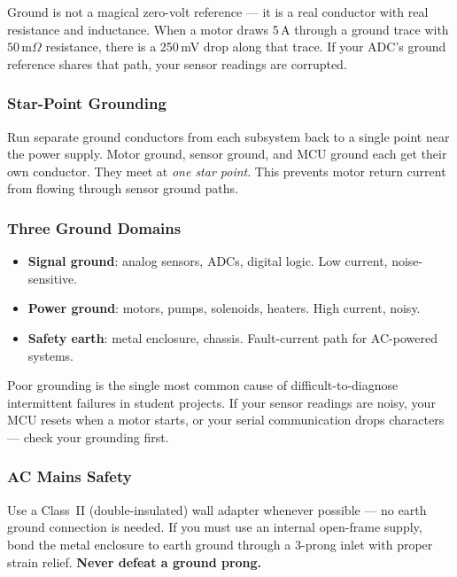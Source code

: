 \documentclass[11pt,letterpaper,twoside,openany]{book}
\newcommand{\mohm}{\,\text{m}\Omega}
\begin{document}
Ground is not a magical zero-volt reference --- it is a real conductor with real resistance and inductance. When a motor draws 5\,A through a ground trace with $50\mohm$ resistance, there is a 250\,mV drop along that trace. If your ADC's ground reference shares that path, your sensor readings are corrupted.

\subsubsection{Star-Point Grounding}
Run separate ground conductors from each subsystem back to a single point near the power supply. Motor ground, sensor ground, and MCU ground each get their own conductor. They meet at \emph{one star point}. This prevents motor return current from flowing through sensor ground paths.

\subsubsection{Three Ground Domains}
\begin{itemize}[nosep,leftmargin=1.5em]
  \item \textbf{Signal ground}: analog sensors, ADCs, digital logic. Low current, noise-sensitive.
  \item \textbf{Power ground}: motors, pumps, solenoids, heaters. High current, noisy.
  \item \textbf{Safety earth}: metal enclosure, chassis. Fault-current path for AC-powered systems.
\end{itemize}

\begin{warningbox}
Poor grounding is the single most common cause of difficult-to-diagnose intermittent failures in student projects. If your sensor readings are noisy, your MCU resets when a motor starts, or your serial communication drops characters --- check your grounding first.
\end{warningbox}

\subsubsection{AC Mains Safety}
Use a Class~II (double-insulated) wall adapter whenever possible --- no earth ground connection is needed. If you must use an internal open-frame supply, bond the metal enclosure to earth ground through a 3-prong inlet with proper strain relief. \textbf{Never defeat a ground prong.}
\end{document}
